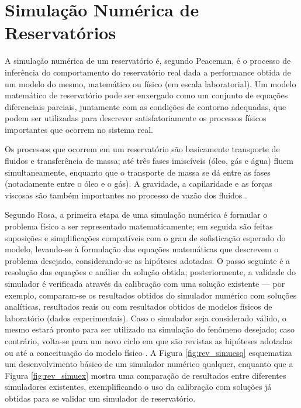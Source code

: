 
\section{Simula\c{c}\~{a}o Num\'{e}rica de Reservat\'{o}rios}

A simula\c{c}\~{a}o num\'{e}rica de um reservat\'{o}rio \'{e}, segundo Peaceman, \'{e} o processo de infer\^{e}ncia do comportamento do reservat\'{o}rio real dada a performance obtida de um modelo do mesmo, matem\'{a}tico ou f\'{i}sico (em escala laboratorial). Um modelo matem\'{a}tico de reservat\'{o}rio pode ser enxergado como um conjunto de equa\c{c}\~{o}es diferenciais parciais, juntamente com as condi\c{c}\~{o}es de contorno adequadas, que podem ser utilizadas para descrever satisfatoriamente os processos f\'{i}sicos importantes que ocorrem no sistema real.

Os processos que ocorrem em um reservat\'{o}rio s\~{a}o basicamente transporte de fluidos e transfer\^{e}ncia de massa; at\'{e} tr\^{e}s fases imisc\'{i}veis (\'{o}leo, g\'{a}s e \'{a}gua) fluem simultaneamente, enquanto que o transporte de massa se d\'{a} entre as fases (notadamente entre o \'{o}leo e o g\'{a}s). A gravidade, a capilaridade e as for\c{c}as viscosas s\~{a}o tamb\'{e}m importantes no processo de vaz\~{a}o dos fluidos \cite{simres}.

Segundo Rosa, a primeira etapa de uma simula\c{c}\~{a}o num\'{e}rica \'{e} formular o problema f\'{i}sico a ser representado matematicamente; em seguida s\~{a}o feitas suposi\c{c}\~{o}es e simplifica\c{c}\~{o}es compat\'{i}veis com o grau de sofistica\c{c}\~{a}o esperado do modelo, levando-se \`{a} formula\c{c}\~{a}o das equa\c{c}\~{o}es matem\'{a}ticas que descrevem o problema desejado, considerando-se as hip\'{o}teses adotadas. O passo seguinte \'{e} a resolu\c{c}\~{a}o das equa\c{c}\~{o}es e an\'{a}lise da solu\c{c}\~{a}o obtida; posteriormente, a validade do simulador \'{e} verificada atrav\'{e}s da calibra\c{c}\~{a}o com uma solu\c{c}\~{a}o existente --- por exemplo, comparam-se os resultados obtidos do simulador num\'{e}rico com solu\c{c}\~{o}es anal\'{i}ticas, resultados reais ou com resultados obtidos de modelos f\'{i}sicos de laborat\'{o}rio (dados experimentais). Caso o simulador seja considerado v\'{a}lido, o mesmo estar\'{a} pronto para ser utilizado na simula\c{c}\~{a}o do fen\^{o}meno desejado; caso contr\'{a}rio, volta-se para um novo ciclo em que s\~{a}o revistas as hip\'{o}teses adotadas ou at\'{e} a conceitua\c{c}\~{a}o do modelo f\'{i}sico \cite[p. 520]{engres}. A Figura \ref{fig:rev_simuesq} esquematiza um desenvolvimento b\'{a}sico de um simulador num\'{e}rico qualquer, enquanto que a Figura \ref{fig:rev_simuex} mostra uma compara\c{c}\~{a}o de resultados entre diferentes simuladores existentes, exemplificando o uso da calibra\c{c}\~{a}o com solu\c{c}\~{o}es j\'{a} obtidas para se validar um simulador de reservat\'{o}rio. 

